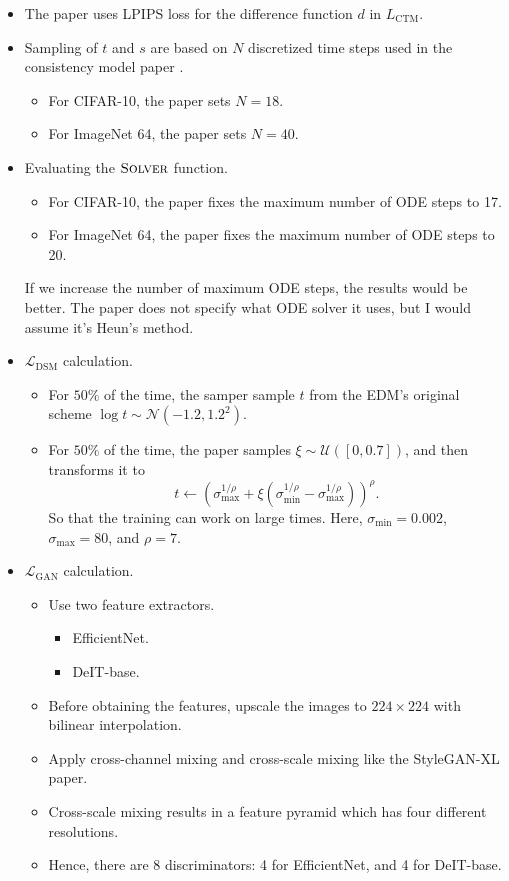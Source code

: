 \documentclass[10pt]{article}
\newcommand{\mrm}[1]{\mathrm{#1}}
\newcommand{\mcal}[1]{\mathcal{#1}}
\begin{document}
\begin{itemize}
  \item The paper uses LPIPS loss for the difference function $d$ in $L_{\mrm{CTM}}$.
  
  \item Sampling of $t$ and $s$ are based on $N$ discretized time steps used in the consistency model paper \cite{Song:2023}.
  \begin{itemize}
    \item For CIFAR-10, the paper sets $N = 18$.
    \item For ImageNet 64, the paper sets $N = 40$.
  \end{itemize}
  
  \item Evaluating the $\textsc{Solver}$ function.
  \begin{itemize}
    \item For CIFAR-10, the paper fixes the maximum number of ODE steps to 17.
    \item For ImageNet 64, the paper fixes the maximum number of ODE steps to 20.
  \end{itemize}
  If we increase the number of maximum ODE steps, the results would be better. The paper does not specify what ODE solver it uses, but I would assume it's Heun's method.

  \item $\mcal{L}_{\mrm{DSM}}$ calculation.
  \begin{itemize}
    \item For $50\%$ of the time, the samper sample $t$ from the EDM's original scheme $\log t \sim \mcal{N}(-1.2, 1.2^2)$.
    \item For $50\%$ of the time, the paper samples $\xi \sim \mcal{U}([0,0.7])$, and then transforms it to $$t \leftarrow (\sigma_{\max}^{1/\rho} + \xi(\sigma_{\min}^{1/\rho} - \sigma_{\max}^{1/\rho}))^{\rho}.$$ So that the training can work on large times. Here, $\sigma_{\min} = 0.002$, $\sigma_{\max} = 80$, and $\rho = 7$.
  \end{itemize}

  \item $\mcal{L}_{\mrm{GAN}}$ calculation.
  \begin{itemize}
    \item Use two feature extractors.
    \begin{itemize}
      \item EfficientNet.
      \item DeIT-base.
    \end{itemize}
    \item Before obtaining the features, upscale the images to $224 \times 224$ with bilinear interpolation.
    \item Apply cross-channel mixing and cross-scale mixing like the StyleGAN-XL paper.
    \item Cross-scale mixing results in a feature pyramid which has four different resolutions.
    \item Hence, there are 8 discriminators: 4 for EfficientNet, and 4 for DeIT-base.
  \end{itemize}


\end{itemize}
\end{document}
